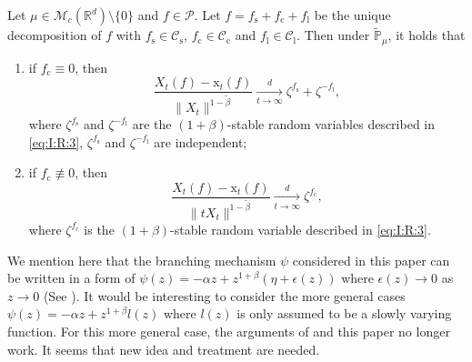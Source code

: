 \documentclass{amse-new}
\numberwithin{equation}{section}
\begin{document}
\begin{corollary}
	Let $\mu\in \mathcal M_c(\mathbb R^d)\setminus \{0\}$ and $f\in \mathcal P$.
	Let  $f=f_\mathrm s + f_\mathrm c + f_\mathrm l$ be the unique decomposition of $f$ with $f_\mathrm s \in \mathcal C_\mathrm s$, $f_\mathrm c \in \mathcal C_\mathrm c$ and $f_\mathrm l \in \mathcal C_\mathrm l$.
	Then under $\widetilde {\mathbb{P}}_{\mu}$, it holds that
\begin{enumerate}
\item
	if $f_\mathrm c\equiv 0$, then
\[
    \frac{ X_t(f) - \mathrm x_t(f)}{\|X_t\|^{1-\tilde \beta}}
    \xrightarrow[t\to \infty]{d} \zeta^{f_\mathrm s}+\zeta^{-f_\mathrm l},
\]
	where $\zeta^{f_\mathrm s}$ and $\zeta^{-f_\mathrm l}$ are the $(1+\beta)$-stable random variables described in \eqref{eq:I:R:3}, $\zeta^{f_\mathrm s}$ and $\zeta^{-f_\mathrm l}$ are independent;
\item
if $f_\mathrm c\not\equiv 0$, then
\[
    \frac{ X_t(f) - \mathrm x_t(f)}{\|tX_t\|^{1-\tilde \beta}}
    \xrightarrow[t\to \infty]{d}
   \zeta^{f_\mathrm c},
\]
	where $\zeta^{f_\mathrm c}$ is the $(1+\beta)$-stable random variable described in \eqref{eq:I:R:3}.
\end{enumerate}
\end{corollary}


\begin{remark}
	We mention here that  the branching mechanism $\psi$ considered in this paper can be written in a form of $\psi(z)= -\alpha z + z^{1+\beta} (\eta + \epsilon(z))$ where $\epsilon (z) \to 0$ as $z \to 0$ (See \cite[Remark 1.3]{RenSongSunZhao2019Stable}).
	It would be interesting to consider the more general cases $\psi(z)= -\alpha z + z^{1+\beta}l(z)$ where $l(z)$ is only assumed to be a slowly varying function.
For this more general case, the arguments of \cite{RenSongSunZhao2019Stable} and this paper no longer work. It seems that new idea and treatment are needed.
\end{remark}
	
\end{document}
